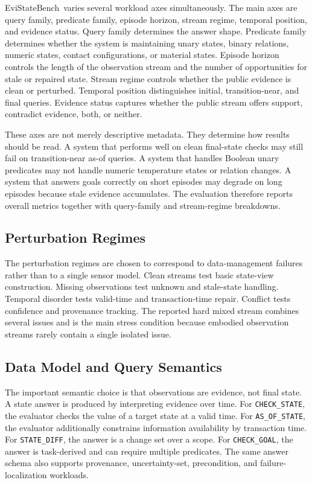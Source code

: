 \documentclass[conference]{IEEEtran}
\newcommand{\bench}{EviStateBench}
\begin{document}
\bench\ varies several workload axes simultaneously. The main axes are query family, predicate family, episode horizon, stream regime, temporal position, and evidence status. Query family determines the answer shape. Predicate family determines whether the system is maintaining unary states, binary relations, numeric states, contact configurations, or material states. Episode horizon controls the length of the observation stream and the number of opportunities for stale or repaired state. Stream regime controls whether the public evidence is clean or perturbed. Temporal position distinguishes initial, transition-near, and final queries. Evidence status captures whether the public stream offers support, contradict evidence, both, or neither.

These axes are not merely descriptive metadata. They determine how results should be read. A system that performs well on clean final-state checks may still fail on transition-near as-of queries. A system that handles Boolean unary predicates may not handle numeric temperature states or relation changes. A system that answers goals correctly on short episodes may degrade on long episodes because stale evidence accumulates. The evaluation therefore reports overall metrics together with query-family and stream-regime breakdowns.

\subsection{Perturbation Regimes}

The perturbation regimes are chosen to correspond to data-management failures rather than to a single sensor model. Clean streams test basic state-view construction. Missing observations test unknown and stale-state handling. Temporal disorder tests valid-time and transaction-time repair. Conflict tests confidence and provenance tracking. The reported hard mixed stream combines several issues and is the main stress condition because embodied observation streams rarely contain a single isolated issue.

\subsection{Data Model and Query Semantics}

The important semantic choice is that observations are evidence, not final state. A state answer is produced by interpreting evidence over time. For \texttt{CHECK\_STATE}, the evaluator checks the value of a target state at a valid time. For \texttt{AS\_OF\_STATE}, the evaluator additionally constrains information availability by transaction time. For \texttt{STATE\_DIFF}, the answer is a change set over a scope. For \texttt{CHECK\_GOAL}, the answer is task-derived and can require multiple predicates. The same answer schema also supports provenance, uncertainty-set, precondition, and failure-localization workloads.
\end{document}
